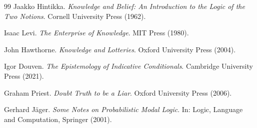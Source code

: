 \documentclass[11pt,a4paper]{article}
\begin{document}
\begin{thebibliography}{99}
Jaakko Hintikka.
\textit{Knowledge and Belief: An Introduction to the Logic of the Two Notions}.
Cornell University Press (1962).

Isaac Levi.
\textit{The Enterprise of Knowledge}.
MIT Press (1980).

John Hawthorne.
\textit{Knowledge and Lotteries}.
Oxford University Press (2004).

Igor Douven.
\textit{The Epistemology of Indicative Conditionals}.
Cambridge University Press (2021).

Graham Priest.
\textit{Doubt Truth to be a Liar}.
Oxford University Press (2006).

Gerhard J\"ager.
\textit{Some Notes on Probabilistic Modal Logic}.
In: Logic, Language and Computation, Springer (2001).

\end{thebibliography}
\end{document}
